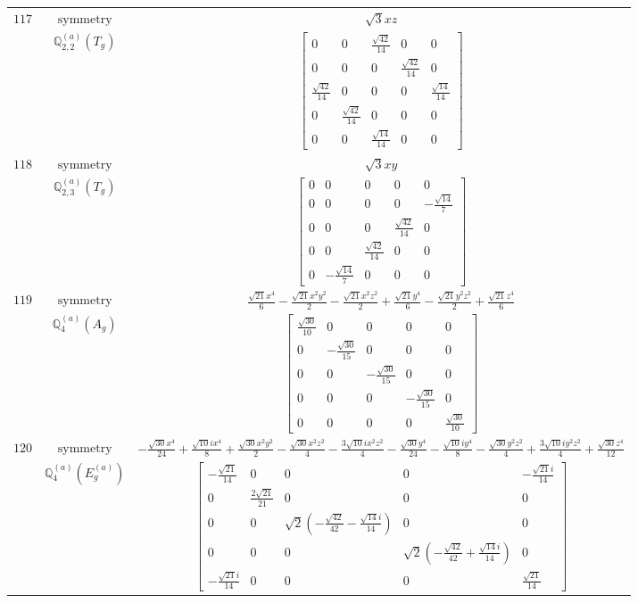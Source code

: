 \documentclass[fleqn,8pt,landscape]{jsarticle}
\begin{document}
\begin{longtable}{ccc}
$ 117 $ & $ \text{symmetry} $ & $ \sqrt{3} x z $ \\
$  $ & $ \mathbb{Q}_{2,2}^{(a)}(T_{g}) $ & $ \begin{bmatrix} 0 & 0 & \frac{\sqrt{42}}{14} & 0 & 0 \\ 0 & 0 & 0 & \frac{\sqrt{42}}{14} & 0 \\ \frac{\sqrt{42}}{14} & 0 & 0 & 0 & \frac{\sqrt{14}}{14} \\ 0 & \frac{\sqrt{42}}{14} & 0 & 0 & 0 \\ 0 & 0 & \frac{\sqrt{14}}{14} & 0 & 0 \end{bmatrix} $ \\ \hline
$ 118 $ & $ \text{symmetry} $ & $ \sqrt{3} x y $ \\
$  $ & $ \mathbb{Q}_{2,3}^{(a)}(T_{g}) $ & $ \begin{bmatrix} 0 & 0 & 0 & 0 & 0 \\ 0 & 0 & 0 & 0 & - \frac{\sqrt{14}}{7} \\ 0 & 0 & 0 & \frac{\sqrt{42}}{14} & 0 \\ 0 & 0 & \frac{\sqrt{42}}{14} & 0 & 0 \\ 0 & - \frac{\sqrt{14}}{7} & 0 & 0 & 0 \end{bmatrix} $ \\ \hline
$ 119 $ & $ \text{symmetry} $ & $ \frac{\sqrt{21} x^{4}}{6} - \frac{\sqrt{21} x^{2} y^{2}}{2} - \frac{\sqrt{21} x^{2} z^{2}}{2} + \frac{\sqrt{21} y^{4}}{6} - \frac{\sqrt{21} y^{2} z^{2}}{2} + \frac{\sqrt{21} z^{4}}{6} $ \\
$  $ & $ \mathbb{Q}_{4}^{(a)}(A_{g}) $ & $ \begin{bmatrix} \frac{\sqrt{30}}{10} & 0 & 0 & 0 & 0 \\ 0 & - \frac{\sqrt{30}}{15} & 0 & 0 & 0 \\ 0 & 0 & - \frac{\sqrt{30}}{15} & 0 & 0 \\ 0 & 0 & 0 & - \frac{\sqrt{30}}{15} & 0 \\ 0 & 0 & 0 & 0 & \frac{\sqrt{30}}{10} \end{bmatrix} $ \\ \hline
$ 120 $ & $ \text{symmetry} $ & $ - \frac{\sqrt{30} x^{4}}{24} + \frac{\sqrt{10} i x^{4}}{8} + \frac{\sqrt{30} x^{2} y^{2}}{2} - \frac{\sqrt{30} x^{2} z^{2}}{4} - \frac{3 \sqrt{10} i x^{2} z^{2}}{4} - \frac{\sqrt{30} y^{4}}{24} - \frac{\sqrt{10} i y^{4}}{8} - \frac{\sqrt{30} y^{2} z^{2}}{4} + \frac{3 \sqrt{10} i y^{2} z^{2}}{4} + \frac{\sqrt{30} z^{4}}{12} $ \\
$  $ & $ \mathbb{Q}_{4}^{(a)}(E_{g}^{(a)}) $ & $ \begin{bmatrix} - \frac{\sqrt{21}}{14} & 0 & 0 & 0 & - \frac{\sqrt{21} i}{14} \\ 0 & \frac{2 \sqrt{21}}{21} & 0 & 0 & 0 \\ 0 & 0 & \sqrt{2} \left(- \frac{\sqrt{42}}{42} - \frac{\sqrt{14} i}{14}\right) & 0 & 0 \\ 0 & 0 & 0 & \sqrt{2} \left(- \frac{\sqrt{42}}{42} + \frac{\sqrt{14} i}{14}\right) & 0 \\ - \frac{\sqrt{21} i}{14} & 0 & 0 & 0 & \frac{\sqrt{21}}{14} \end{bmatrix} $ \\ \hline

\end{longtable}
\end{document}
